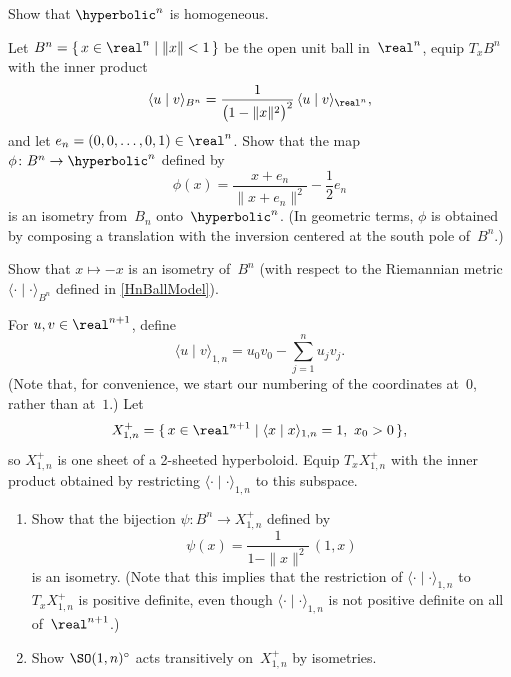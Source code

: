 \begin{exercises}

\item \label{HnisHomog}
 Show that $\hyperbolic^n$ is homogeneous. 

\item \label{HnBallModel}
 Let $B^n = \{\, x \in \real^n \mid \|x\| < 1 \,\}$ be the open unit
ball in~$\real^n$, equip $T_x B^n$ with the inner product
 $$ \langle u \mid v \rangle_{B^n}
 = \frac{1}{ \bigl( 1 - \|x\|^2 \bigr)^2} \, \langle u \mid v
\rangle_{\real^n} ,$$
 and let $e_n = (0,0,\ldots,0,1) \in \real^n$.
 Show that the map $\phi \colon B^n \to \hyperbolic^n$ defined by
 $$ \phi(x) = \frac{x + e_n}{\|x + e_n\|^2} - \frac{1}{2} e_n$$
 is an isometry from~$B_n$ onto~$\hyperbolic^n$. (In geometric terms,
$\phi$ is obtained by composing a translation with the inversion
centered at the south pole of~$B^n$.)

\item \label{invol(BallModel)}
 Show that $x \mapsto -x$ is an isometry of~$B^n$ (with respect to the
Riemannian metric $\langle \cdot \mid \cdot \rangle_{B^n}$ defined in \cref{HnBallModel}).

\item \label{HyperModel}
 For $u,v \in \real^{n+1}$, define
 $$ \langle u \mid v \rangle_{1,n}
 = u_0 v_0 - \sum_{j=1}^n u_j v_j .$$
 (Note that, for convenience, we start our numbering of the
coordinates at~$0$, rather than at~$1$.) Let
 $$ X_{1,n}^+ = \{\, x \in \real^{n+1} \mid \langle x \mid x
\rangle_{1,n} = 1, \ x_0 > 0 \,\} ,$$
 so $X_{1,n}^+$ is one sheet of a 2-sheeted hyperboloid. Equip $T_x
X_{1,n}^+$ with the inner product obtained by restricting $\langle
\cdot \mid \cdot \rangle_{1,n}$ to this subspace. 
 \begin{enumerate}
 \item Show that the bijection $\psi \colon B^n \to X_{1,n}^+$
defined by 
 $$ \psi(x) = \frac{1}{1 - \|x\|^2} \, (1,x) $$
 is an isometry. (Note that this implies that the restriction of
$\langle \cdot \mid \cdot \rangle_{1,n}$ to $T_x X_{1,n}^+$ is
positive definite, even though $\langle \cdot \mid \cdot
\rangle_{1,n}$ is not positive definite on all of~$\real^{n+1}$.)
 \item Show $\SO(1,n)^\circ$ acts transitively on~$X_{1,n}^+$ by
isometries.
 \end{enumerate}


\end{exercises}
